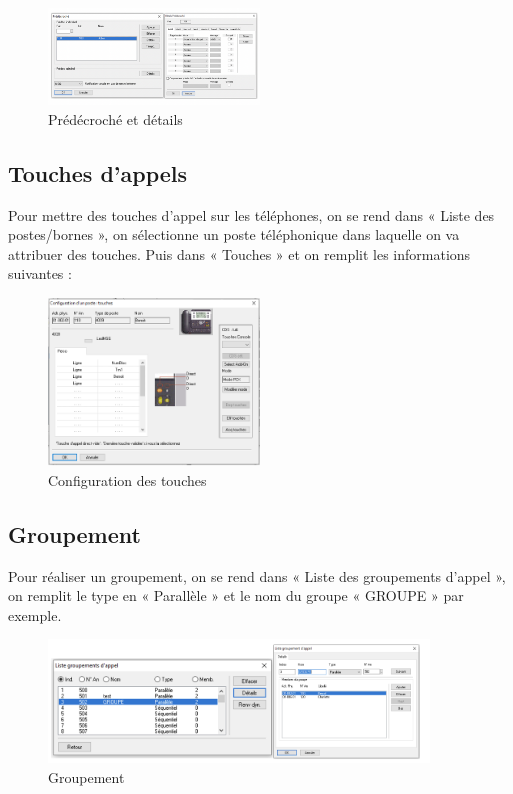 \documentclass[12pt, a4paper]{article}
\begin{document}
	\begin{figure}[H]
		\centering
		\includegraphics[width=0.5\textwidth]{img/pd.png}
		\caption{Prédécroché et détails}
		\label{fig:pd}
	\end{figure}


	\subsection{Touches d'appels}

	Pour mettre des touches d’appel sur les téléphones, on se rend dans « Liste des
	postes/bornes », on sélectionne un poste téléphonique dans laquelle on va attribuer
	des touches. Puis dans « Touches » et on remplit les informations suivantes :

	\begin{figure}[H]
		\centering
		\includegraphics[width=0.5\textwidth]{img/ctou.png}
		\caption{Configuration des touches}
		\label{fig:ctou}
	\end{figure}

	\subsection{Groupement}

	Pour réaliser un groupement, on se rend dans « Liste des groupements d’appel »,
	on remplit le type en « Parallèle » et le nom du groupe « GROUPE » par exemple.

	\begin{figure}[H]
		\centering
		\includegraphics[width=0.9\textwidth]{img/grp.png}
		\caption{Groupement}
		\label{fig:grp}
	\end{figure}
\end{document}
